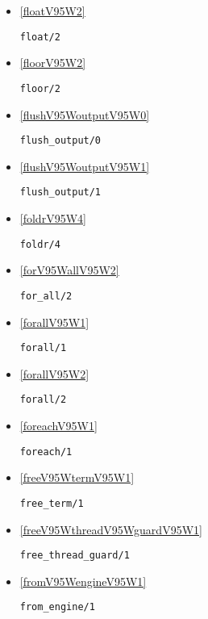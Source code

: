 \begin{itemize}
\item \ref{floatV95W2} 
\begin{verbatim}
float/2
\end{verbatim}

\item \ref{floorV95W2} 
\begin{verbatim}
floor/2
\end{verbatim}

\item \ref{flushV95WoutputV95W0} 
\begin{verbatim}
flush_output/0
\end{verbatim}

\item \ref{flushV95WoutputV95W1} 
\begin{verbatim}
flush_output/1
\end{verbatim}

\item \ref{foldrV95W4} 
\begin{verbatim}
foldr/4
\end{verbatim}

\item \ref{forV95WallV95W2} 
\begin{verbatim}
for_all/2
\end{verbatim}

\item \ref{forallV95W1} 
\begin{verbatim}
forall/1
\end{verbatim}

\item \ref{forallV95W2} 
\begin{verbatim}
forall/2
\end{verbatim}

\item \ref{foreachV95W1} 
\begin{verbatim}
foreach/1
\end{verbatim}

\item \ref{freeV95WtermV95W1} 
\begin{verbatim}
free_term/1
\end{verbatim}

\item \ref{freeV95WthreadV95WguardV95W1} 
\begin{verbatim}
free_thread_guard/1
\end{verbatim}

\item \ref{fromV95WengineV95W1} 
\begin{verbatim}
from_engine/1
\end{verbatim}


\end{itemize}
